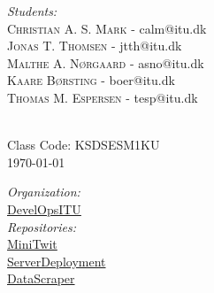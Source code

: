 \begin{titlepage}

\begin{minipage}{0.6\textwidth}
\center
\emph{Students:}\\
\textsc{Christian A. S. Mark} - calm@itu.dk\\
\textsc{Jonas T. Thomsen} - jtth@itu.dk\\ \textsc{Malthe A. Nørgaard} - asno@itu.dk\\ \textsc{Kaare Børsting} - boer@itu.dk\\ \textsc{Thomas M. Espersen} - tesp@itu.dk\\


\end{minipage}\\[2cm]



Class Code: KSDSESM1KU\\
{\large \today}\\[2cm] %


\begin{minipage}{0.6\textwidth}
\center
\emph{Organization:}\\
\href{https://github.com/DevelOpsITU}{DevelOpsITU}\\[0.5cm]

\emph{Repositories:}\\
\href{https://github.com/DevelOpsITU/MiniTwit}{MiniTwit}\\
\href{https://github.com/DevelOpsITU/ServerDeployment}{ServerDeployment}\\
\href{https://github.com/DevelOpsITU/DataScraper}{DataScraper}\\
\end{minipage}

\vfill %

\end{titlepage}
